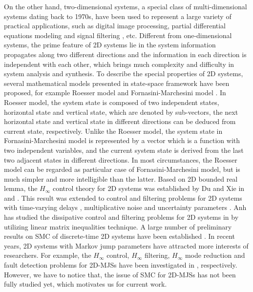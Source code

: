 \documentclass[journal,final,twocolumn]{IEEEtran}
\begin{document}
	On the other hand, two-dimensional systems, a special class of multi-dimensional systems  dating back to 1970s,  have been used to represent a large variety of practical applications, such as digital image processing, partial differential equations modeling and signal filtering \cite{roesser1975discrete,marszalek1984two,rogers2015multidimensional}, etc. Different from one-dimensional systems, the prime feature of  2D systems lie in the system information propagates along two different directions and the information in each direction is independent with each other, which brings much complexity and difficulty in system analysis and synthesis. To describe the special properties of 2D systems, several  mathematical models presented in state-space framework have been proposed, for example Roesser model \cite{roesser1975discrete} and Fornasini-Marchesini model \cite{fornasini1978doubly}. In Roesser model, the system state is composed of two independent states, horizontal state and vertical state, which are denoted by  sub-vectors, the next horizontal state and vertical state in different directions can be deduced from current state, respectively. Unlike the Roesser model, the system state in Fornasini-Marchesini model is represented by a vector which is a function with two independent variables, and the current system state is derived from the  last two adjacent states in different directions. In most circumstances, the Roesser model can be regarded as particular case of Fornasini-Marchesini model, but is much simpler and more intelligible than the latter. Based on 2D bounded real lemma, the $H_{\infty}$ control theory for 2D systems was established by Du and Xie in \cite{du2001h} and \cite{du2002hinfinity}. This result was extended to control and filtering problems for 2D systems with time-varying delays \cite{trinh2016stability},  multiplicative noise \cite{ahn2016stochastic} and uncertainty parameters \cite{chesi2016robust}. 
	Anh has studied  the dissipative control and filtering problems for 2D systems in \cite{ahn2015two}  by utilizing linear matrix inequalities technique.
	A large number of preliminary results on SMC of discrete-time 2D systems have been established \cite{liu2005adaptive,wu2008sliding,yang2019two}.
	In recent years, 2D systems with Markov jump parameters have attracted more interests of researchers. For example,  the $H_{\infty}$ control, $H_{\infty}$ filtering, $H_{\infty}$ mode reduction and fault detection problems for 2D-MJSs have been investigated in \cite{gao2004stabilization,wu2018hcontrol2d,wu2008hfiltering2d,wu2006modelreduction,shen2019dissipativity}, respectively. However, we have to notice that, the issue of SMC  for 2D-MJSs has not been fully studied yet, which motivates us for current work.
	 
\end{document}
